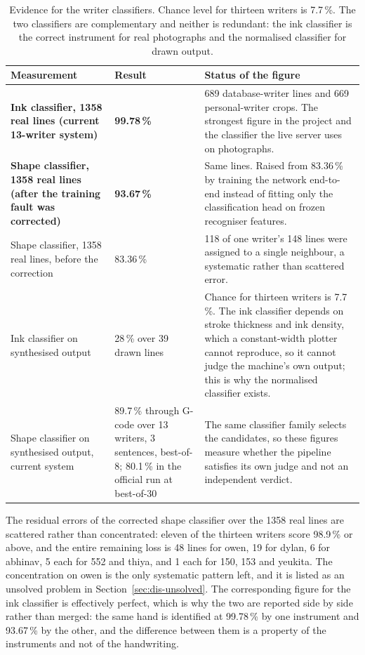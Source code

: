 \begin{table}[h]
\centering
\fontsize{9.5}{11.5}\selectfont
\begin{tabularx}{\linewidth}{|p{4.2cm}|p{2.5cm}|X|}
\hline
\textbf{Measurement} & \textbf{Result} & \textbf{Status of the figure} \\
\hline
\textbf{Ink classifier, 1358 real lines (current 13-writer system)} & \textbf{99.78\,\%} & 689 database-writer lines and 669 personal-writer crops. The strongest figure in the project and the classifier the live server uses on photographs. \\
\hline
\textbf{Shape classifier, 1358 real lines (after the training fault was corrected)} & \textbf{93.67\,\%} & Same lines. Raised from 83.36\,\% by training the network end-to-end instead of fitting only the classification head on frozen recogniser features. \\
\hline
Shape classifier, 1358 real lines, before the correction & 83.36\,\% & 118 of one writer's 148 lines were assigned to a single neighbour, a systematic rather than scattered error. \\
\hline
Ink classifier on synthesised output & 28\,\% over 39 drawn lines & Chance for thirteen writers is 7.7\,\%. The ink classifier depends on stroke thickness and ink density, which a constant-width plotter cannot reproduce, so it cannot judge the machine's own output; this is why the normalised classifier exists. \\
\hline
Shape classifier on synthesised output, current system & 89.7\,\% through G-code over 13 writers, 3 sentences, best-of-8; 80.1\,\% in the official run at best-of-30 & The same classifier family selects the candidates, so these figures measure whether the pipeline satisfies its own judge and not an independent verdict. \\
\hline
\end{tabularx}
\caption{Evidence for the writer classifiers. Chance level for thirteen writers is 7.7\,\%. The two classifiers are complementary and neither is redundant: the ink classifier is the correct instrument for real photographs and the normalised classifier for drawn output.}
\label{tab:wid-results}
\end{table}

The residual errors of the corrected shape classifier over the 1358 real lines are scattered rather than concentrated: eleven of the thirteen writers score 98.9\,\% or above, and the entire remaining loss is 48 lines for owen, 19 for dylan, 6 for abhinav, 5 each for 552 and thiya, and 1 each for 150, 153 and yeukita.
The concentration on owen is the only systematic pattern left, and it is listed as an unsolved problem in Section~\ref{sec:dis-unsolved}.
The corresponding figure for the ink classifier is effectively perfect, which is why the two are reported side by side rather than merged: the same hand is identified at 99.78\,\% by one instrument and 93.67\,\% by the other, and the difference between them is a property of the instruments and not of the handwriting.

